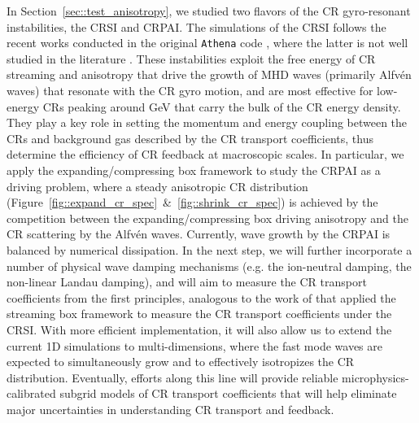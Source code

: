 \documentclass[fleqn,usenatbib]{mnras}
\begin{document}
In Section~\ref{sec::test_anisotropy}, we studied two flavors of the CR gyro-resonant instabilities, the CRSI and CRPAI. The simulations of the CRSI follows the recent works conducted in the original \texttt{Athena} code \citep{2019ApJ...876...60B}, where the latter is not well studied in the literature \citep{2006MNRAS.373.1195L,2018MNRAS.476.2779L,2020ApJ...890...67Z}. These instabilities exploit the free energy of CR streaming and anisotropy that drive the growth of MHD waves (primarily Alfv\'en waves) that resonate with the CR gyro motion, and are most effective for low-energy CRs peaking around GeV that carry the bulk of the CR energy density. They play a key role in setting the momentum and energy coupling between the CRs and background gas described by the CR transport coefficients, thus determine the efficiency of CR feedback at macroscopic scales. 
In particular, we apply the expanding/compressing box framework to study the CRPAI as a driving problem, where a steady anisotropic CR distribution (Figure~\ref{fig::expand_cr_spec}~\&~\ref{fig::shrink_cr_spec}) is achieved by the competition between the expanding/compressing box driving anisotropy and the CR scattering by the Alfv\'en waves.
Currently, wave growth by the CRPAI is balanced by numerical dissipation. In the next step, we will further incorporate a number of physical wave damping mechanisms
(e.g. the ion-neutral damping, the non-linear Landau damping), and will aim to measure the CR
transport coefficients
from the first principles, analogous to the work of \citet{2022ApJ...928..112B} that applied the streaming box framework to measure the CR transport coefficients under the CRSI. With more efficient implementation, it will also allow us to extend the current 1D simulations to multi-dimensions,
where the fast mode waves are expected to simultaneously grow and to effectively isotropizes the CR distribution.
Eventually, efforts along this line will provide reliable microphysics-calibrated subgrid models of CR transport coefficients that will help eliminate major uncertainties in understanding CR transport and feedback.
\end{document}
